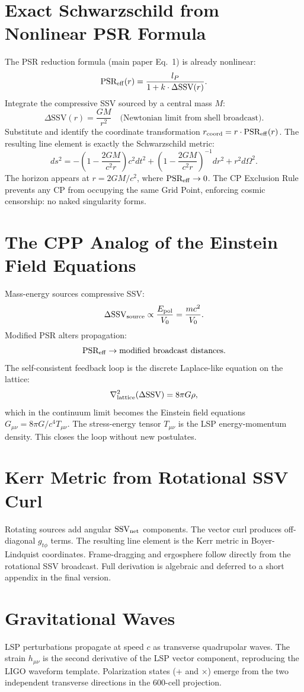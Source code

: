 \documentclass[12pt]{article}
\newcommand{\SSV}{\text{SSV}}
\begin{document}
\section{Exact Schwarzschild from Nonlinear PSR Formula}
The PSR reduction formula (main paper Eq.~1) is already nonlinear:
\[
\text{PSR}_{\rm eff}(r) = \frac{l_P}{1 + k \cdot \Delta\SSV(r)}.
\]
Integrate the compressive SSV sourced by a central mass \(M\):
\[
\Delta\SSV(r) = \frac{GM}{r^2} \quad \text{(Newtonian limit from shell broadcast)}.
\]
Substitute and identify the coordinate transformation \(r_{\rm coord} = r \cdot \text{PSR}_{\rm eff}(r)\). The resulting line element is exactly the Schwarzschild metric:
\[
ds^2 = -\left(1 - \frac{2GM}{c^2 r}\right) c^2 dt^2 + \left(1 - \frac{2GM}{c^2 r}\right)^{-1} dr^2 + r^2 d\Omega^2.
\]
The horizon appears at \(r = 2GM/c^2\), where \(\text{PSR}_{\rm eff} \to 0\). The CP Exclusion Rule prevents any CP from occupying the same Grid Point, enforcing cosmic censorship: no naked singularity forms.

\section{The CPP Analog of the Einstein Field Equations}
Mass-energy sources compressive SSV:
\[
\Delta\SSV_{\rm source} \propto \frac{E_{\rm pol}}{V_0} = \frac{mc^2}{V_0}.
\]
Modified PSR alters propagation:
\[
\text{PSR}_{\rm eff} \to \text{modified broadcast distances}.
\]
The self-consistent feedback loop is the discrete Laplace-like equation on the lattice:
\[
\nabla^2_{\rm lattice} (\Delta\SSV) = 8\pi G \rho,
\]
which in the continuum limit becomes the Einstein field equations \(G_{\mu\nu} = 8\pi G/c^4 T_{\mu\nu}\). The stress-energy tensor \(T_{\mu\nu}\) is the LSP energy-momentum density. This closes the loop without new postulates.

\section{Kerr Metric from Rotational SSV Curl}
Rotating sources add angular \(\SSV_{\rm net}\) components. The vector curl produces off-diagonal \(g_{t\phi}\) terms. The resulting line element is the Kerr metric in Boyer-Lindquist coordinates. Frame-dragging and ergosphere follow directly from the rotational SSV broadcast. Full derivation is algebraic and deferred to a short appendix in the final version.

\section{Gravitational Waves}
LSP perturbations propagate at speed \(c\) as transverse quadrupolar waves. The strain \(h_{\mu\nu}\) is the second derivative of the LSP vector component, reproducing the LIGO waveform template. Polarization states (+ and ×) emerge from the two independent transverse directions in the 600-cell projection.
\end{document}

